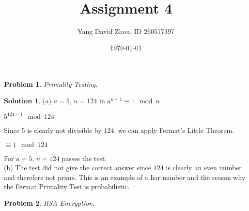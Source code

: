 \documentclass{article}
\newtheorem{problem}{Problem}
\theoremstyle{definition}
\newtheorem*{solution}{Solution}
\begin{document}
 \title{Assignment 4} 

\author{Yang David Zhou, ID 260517397} 

\date{\today}

\maketitle

\begin{problem} 

Primality Testing.

\end{problem}

\begin{solution}

(a) \(a=5\), \(n=124\) in \(a^{n-1} \equiv 1\mod n\)

\(5^{124-1} \mod 124\)

Since \(5\) is clearly not divisible by \(124\), we can apply Fermat's Little Theorem.

\(\equiv 1 \mod 124\)

For \(a=5\), \(n=124\) passes the test. \\

(b) The test did not give the correct answer since \(124\) is clearly an even number and therefore not prime. This is an example of a liar number and the reason why the Fermat Primality Test is probabilistic.

\end{solution}

\begin{problem} 

RSA Encryption.

\end{problem}
\end{document}
